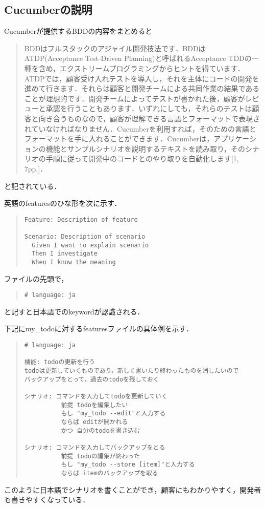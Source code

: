 
\subsection{Cucumberの説明}
Cucumberが提供するBDDの内容をまとめると

\begin{quotation}
BDDはフルスタックのアジャイル開発技法です．BDDはATDP(Acceptance Test-Driven Planning)と呼ばれるAcceptance TDDの一種を含め，エクストリームプログラミングからヒントを得ています．ATDPでは，顧客受け入れテストを導入し，それを主体にコードの開発を進めて行きます．それらは顧客と開発チームによる共同作業の結果であることが理想的です．開発チームによってテストが書かれた後，顧客がレビューと承認を行うこともあります．いずれにしても，それらのテストは顧客と向き合うものなので，顧客が理解できる言語とフォーマットで表現されていなければなりません．Cucumberを利用すれば，そのための言語とフォーマットを手に入れることができます．Cucumberは，アプリケーションの機能とサンプルシナリオを説明するテキストを読み取り，そのシナリオの手順に従って開発中のコードとのやり取りを自動化します[1, 7pp.]．

\end{quotation}
と記されている．

英語のfeaturesのひな形を次に示す．
\begin{quote}\begin{verbatim}
Feature: Description of feature

Scenario: Description of scenario
  Given I want to explain scenario
  Then I investigate
  When I know the meaning
\end{verbatim}\end{quote}
ファイルの先頭で，
\begin{quote}\begin{verbatim}
# language: ja
\end{verbatim}\end{quote}
と記すと日本語でのkeywordが認識される．

下記にmy\_todoに対するfeaturesファイルの具体例を示す．
\begin{quote}\begin{verbatim}
# language: ja

機能: todoの更新を行う
todoは更新していくものであり，新しく書いたり終わったものを消したいので
バックアップをとって，過去のtodoを残しておく

シナリオ: コマンドを入力してtodoを更新していく
          前提 todoを編集したい
          もし "my_todo --edit"と入力する
          ならば editが開かれる
          かつ 自分のtodoを書き込む

シナリオ: コマンドを入力してバックアップをとる
          前提 todoの編集が終わった
          もし "my_todo --store [item]"と入力する
          ならば itemのバックアップを取る
\end{verbatim}\end{quote}
このように日本語でシナリオを書くことができ，顧客にもわかりやすく，開発者も書きやすくなっている．

